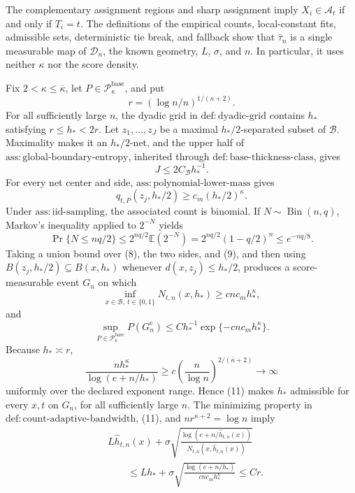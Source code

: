 The complementary assignment regions and sharp assignment imply \(X_i\in\mathcal A_t\) if and only if \(T_i=t\).  The definitions of the empirical counts, local-constant fits, admissible sets, deterministic tie break, and fallback show that \(\widehat\tau_n\) is a single measurable map of \(\mathcal D_n\), the known geometry, \(L\), \(\sigma\), and \(n\).  In particular, it uses neither \(\kappa\) nor the score density.

Fix \(2<\kappa\le\overline\kappa\), let \(P\in\mathcal P_{\kappa}^{\mathrm{base}}\), and put
\[
 r=(\log n/n)^{1/(\kappa+2)}.
\]
For all sufficiently large \(n\), the dyadic grid in \(\mathrm{def:dyadic\text{-}grid}\) contains \(h_*\) satisfying \(r\le h_*<2r\).  Let \(z_1,\ldots,z_J\) be a maximal \(h_*/2\)-separated subset of \(\mathcal B\).  Maximality makes it an \(h_*/2\)-net, and the upper half of \(\mathrm{ass:global\text{-}boundary\text{-}entropy}\), inherited through \(\mathrm{def:base\text{-}thickness\text{-}class}\), gives
\[
 J\le 2C_{\mathcal B}h_*^{-1}. \tag{8}
\]
For every net center and side, \(\mathrm{ass:polynomial\text{-}lower\text{-}mass}\) gives
\[
 q_{t,P}(z_j,h_*/2)\ge c_m(h_*/2)^\kappa. \tag{9}
\]
Under \(\mathrm{ass:iid\text{-}sampling}\), the associated count is binomial.  If \(N\sim\operatorname{Bin}(n,q)\), Markov's inequality applied to \(2^{-N}\) yields
\[
 \Pr\{N\le nq/2\}
 \le 2^{nq/2}\mathbb E(2^{-N})
 =2^{nq/2}(1-q/2)^n
 \le e^{-nq/8}. \tag{10}
\]
Taking a union bound over (8), the two sides, and (9), and then using \(B(z_j,h_*/2)\subseteq B(x,h_*)\) whenever \(d(x,z_j)\le h_*/2\), produces a score-measurable event \(G_n\) on which
\[
 \inf_{x\in\mathcal B,\ t\in\{0,1\}}N_{t,n}(x,h_*)
 \ge c n c_mh_*^\kappa, \tag{11}
\]
and
\[
 \sup_{P\in\mathcal P_{\kappa}^{\mathrm{base}}}P(G_n^c)
 \le Ch_*^{-1}\exp\{-c n c_mh_*^\kappa\}. \tag{12}
\]
Because \(h_*\asymp r\),
\[
 \frac{nh_*^\kappa}{\log(e+n/h_*)}
 \ge c\left(\frac n{\log n}\right)^{2/(\overline\kappa+2)}\longrightarrow\infty \tag{13}
\]
uniformly over the declared exponent range.  Hence (11) makes \(h_*\) admissible for every \(x,t\) on \(G_n\), for all sufficiently large \(n\).  The minimizing property in \(\mathrm{def:count\text{-}adaptive\text{-}bandwidth}\), (11), and \(nr^{\kappa+2}=\log n\) imply
\[
 \begin{aligned}
 &L\widehat h_{t,n}(x)
 +\sigma\sqrt{\frac{\log(e+n/\widehat h_{t,n}(x))}
 {N_{t,n}(x,\widehat h_{t,n}(x))}}\\
 &\qquad\le Lh_*+
 \sigma\sqrt{\frac{\log(e+n/h_*)}{c n c_mh_*^\kappa}}
 \le Cr. \tag{14}
 \end{aligned}
\]


